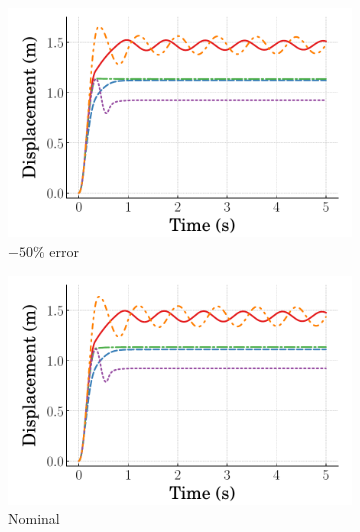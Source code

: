 \begin{figure}[tb]
    \centering
    \begin{subfigure}[b]{0.32\textwidth}
        \centering
        \includegraphics[width=\textwidth]{figures/figures_robustness/duffing_robustness/time_responses/0p5k_displacement.pdf}
        \caption{$-50\%$ error}
        \label{subfig_chap4:duffing_0p5k_displacement}
    \end{subfigure}
    \hfill
    \begin{subfigure}[b]{0.32\textwidth}
        \centering
        \includegraphics[width=\textwidth]{figures/figures_robustness/duffing_robustness/time_responses/1p0k_displacement.pdf}
        \caption{Nominal}
        \label{subfig_chap4:duffing_1p0k_displacement}
    \end{subfigure}
    \hfill
    \begin{subfigure}[b]{0.32\textwidth}
        \centering

\end{subfigure}
\end{figure}
